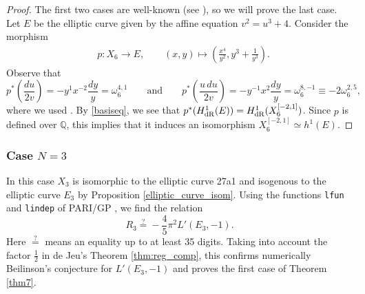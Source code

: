 \documentclass[11pt,a4,leqno]{amsart}
\theoremstyle{my theoremstyle}
\theoremstyle{dfn}
\theoremstyle{remark}
\renewcommand{\1}{\mathbbm{1}}
\newcommand{\Q}{\mathbb{Q}}
\numberwithin{equation}{section}
\begin{document}
\begin{proof}
The first two cases are well-known (see \cite[Sections 5.2 and 5.3]{Ots11_2}), so we will prove the last case. Let $E$ be the elliptic curve given by the affine equation $v^2=u^3+4$.
Consider the morphism
\begin{align*}
& p\colon X_6 \longrightarrow E, \qquad  (x,y) \longmapsto \left(\frac{x^4}{y^2}, y^3+\frac{1}{y^3}\right).
\end{align*}
Observe that
$$p^*\left(\dfrac{du}{2v}\right) = - y^1 x^{-2} \frac{dy}{y} =  \omega_6^{4,1} \qquad \text{and} \qquad p^*\left(\dfrac{u \, du}{2v}\right) = -y^{-1} x^2 \frac{dy}{y} = \omega_6^{8, -1} \equiv -2\omega_6^{2, 5},$$
where we used \cite[Lemma 4.19]{Ots11}. By \eqref{basiseq}, we see that $p^*(H^1_{\rm dR}(E))= H^1_{\rm dR}(X_6^{[-2, 1]})$. Since $p$ is defined over $\Q$, this implies that it induces an isomorphism $X_6^{[-2,1]}\simeq h^1(E)$.
\end{proof}

\subsubsection{Case $N=3$}

In this case $X_3$ is isomorphic to the elliptic curve 27a1 and isogenous to the elliptic curve $E_{3}$ by Proposition \ref{elliptic_curve_isom}. Using the functions \texttt{lfun} and \texttt{lindep} of PARI/GP \cite{PARI}, we find the relation
\begin{equation*}
    R_3 \stackrel{?}{=} -\frac45 \pi^2 L'(E_{3},-1).
\end{equation*}
Here $\stackrel{?}{=}$ means an equality up to at least 35 digits. Taking into account the factor $\frac12$ in de Jeu's Theorem \ref{thm:reg_comp}, this confirms numerically Beilinson's conjecture for $L'(E_{3},-1)$ and proves the first case of Theorem \ref{thm7}.
\end{document}
